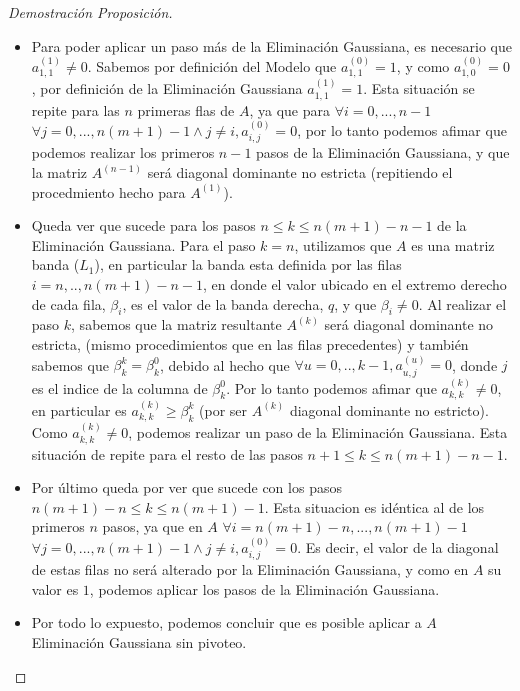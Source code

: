 \begin{proof}[Demostración Proposición]
\begin{itemize}
\item Para poder aplicar un paso más de la Eliminación Gaussiana, es necesario que $a^{(1)}_{1,1} \neq 0$. Sabemos por definición del Modelo que $a^{(0)}_{1,1} = 1$, y como $a^{(0)}_{1,0} = 0$, por definición de la Eliminación Gaussiana $a^{(1)}_{1,1} = 1$. Esta situación se repite para las $n$ primeras flas de $A$, ya que para $\forall i=0,...,n-1$ $\forall j=0,...,n(m+1)-1 \land j \neq i, a^{(0)}_{i,j} = 0$, por lo tanto podemos afimar que podemos realizar los primeros $n-1$ pasos de la Eliminación Gaussiana, y que la matriz $A^{(n-1)}$ será diagonal dominante no estricta (repitiendo el procedmiento hecho para $A^{(1)}$).

\item Queda ver que sucede para los pasos $n \leq k \leq n(m+1)-n-1$ de la Eliminación Gaussiana. Para el paso $k=n$, utilizamos que $A$ es una matriz banda ($L_{1}$), en particular la banda esta definida por las filas $i=n,..,n(m+1)-n-1$, en donde el valor ubicado en el extremo derecho de cada fila, $\beta_{i}$, es el valor de la banda derecha, $q$, y que $\beta_{i} \neq 0$. Al realizar el paso $k$, sabemos que la matriz resultante $A^{(k)}$ será diagonal dominante no estricta, (mismo procedimientos que en las filas precedentes) y también sabemos que $\beta^{k}_{k} = \beta^{0}_{k}$, debido al hecho que $\forall u=0,..,k-1, a^{(u)}_{u,j} = 0$, donde $j$ es el indice de la columna de $\beta^{0}_{k}$. Por lo tanto podemos afimar que $a^{(k)}_{k,k} \neq 0$, en particular es $a^{(k)}_{k,k} \geq \beta^{k}_{k}$ (por ser $A^{(k)}$ diagonal dominante no estricto). Como $a^{(k)}_{k,k} \neq 0$, podemos realizar un paso de la Eliminación Gaussiana. Esta situación de repite para el resto de las pasos $n+1 \leq k \leq n(m+1)-n-1$.

\item Por último queda por ver que sucede con los pasos $ n(m+1)-n \leq k \leq n(m+1)-1$. Esta situacion es idéntica al de los primeros $n$ pasos, ya que en $A$  $\forall i=n(m+1)-n,...,n(m+1)-1$ $\forall j=0,...,n(m+1)-1 \land j \neq i, a^{(0)}_{i,j} = 0$. Es decir, el valor de la diagonal de estas filas no será alterado por la Eliminación Gaussiana, y como en $A$ su valor es $1$, podemos aplicar los pasos de la Eliminación Gaussiana.

\item Por todo lo expuesto, podemos concluir que es posible aplicar a $A$ Eliminación Gaussiana sin pivoteo.

\end{itemize}

\end{proof}


